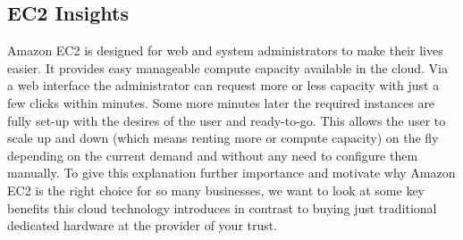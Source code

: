 \subsection{EC2 Insights}
Amazon EC2 is designed for web and system administrators to make their lives easier. It provides easy manageable compute capacity available in the cloud. Via a web interface the administrator can request more or less capacity with just a few clicks within minutes. Some more minutes later the required instances are fully set-up with the desires of the user and ready-to-go. This allows the user to scale up and down (which means renting more or compute capacity) on the fly depending on the current demand and without any need to configure them manually. To give this explanation further importance and motivate why Amazon EC2 is the right choice for so many businesses, we want to look at some key benefits this cloud technology introduces in contrast to buying just traditional dedicated hardware at the provider of your trust. 

